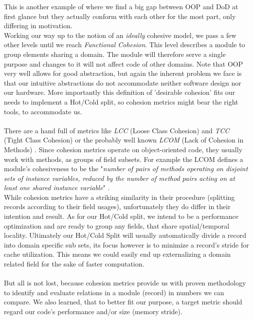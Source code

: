 This is another example of where we find a big gap between OOP and DoD at first glance but they actually conform with each other for the most part, only differing in motivation.\\
Working our way up to the notion of an \textit{ideally} cohesive model, we pass a few other levels until we reach \textit{Functional Cohesion}. This level describes a module to group elements sharing a domain. The module will therefore serve a single purpose and changes to it will not affect code of other domains. Note that OOP very well allows for good abstraction, but again the inherent problem we face is that our intuitive abstractions do not accommodate neither software design nor our hardware. More importantly this definition of 'desirable cohesion' fits our needs to implement a Hot/Cold split, so cohesion metrics might bear the right tools, to accommodate us.\\\\
There are a hand full of metrics like \textit{LCC} (Loose Class Cohesion)  and  \textit{TCC}  (Tight  Class  Cohesion) or the probably well known \textit{LCOM} (Lack of Cohesion in Methods) . Since cohesion metrics operate on object-oriented code, they usually work with methods, as groups of field subsets. For example the LCOM defines a module's cohesiveness to be the "\textit{number of pairs of methods operating on disjoint sets of instance variables, reduced by the number of method pairs acting on at least one shared instance variable}" .\\
While cohesion metrics have a striking similarity in their procedure (splitting records according to their field usages), unfortunately they do differ in their intention and result. As for our Hot/Cold split, we intend to be a performance optimization and are ready to group any fields, that share spatial/temporal locality. Ultimately our Hot/Cold Split will usually automatically divide a record into domain specific sub sets, its focus however is to minimize a record's stride for cache utilization. This means we could easily end up externalizing a domain related field for the sake of faster computation.\\\\
But all is not lost, because cohesion metrics provide us with proven methodology to identify and evaluate relations in a module (record) in numbers we can compare. We also learned, that to better fit our purpose, a target metric should regard our code's performance and/or size (memory stride). 

